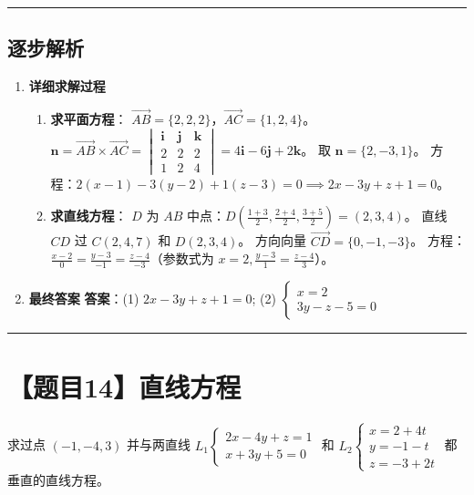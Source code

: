 \documentclass[UTF8]{ctexart}
\newenvironment{redenv}{\color{red}}{}
\newenvironment{detailedanalysis}{%
    \color{red}
    \begin{enumerate}[label=\textbf{第\arabic*步：}, leftmargin=*, align=left, itemsep=1.5ex]
}{%
    \end{enumerate}
}
\newcommand{\problemrule}{\noindent\rule{\textwidth}{1.5pt}\vspace{-0.8em}}
\newcommand{\analysisrule}{\noindent\rule{\textwidth}{0.8pt}\vspace{-0.8em}}
\begin{document}
\begin{redenv}
\analysisrule
\subsection*{逐步解析}

\begin{detailedanalysis}
\item \textbf{详细求解过程}
\begin{enumerate}[label=(\arabic*)]
\item \textbf{求平面方程}：
$\overrightarrow{AB} = \{2, 2, 2\}$，$\overrightarrow{AC} = \{1, 2, 4\}$。
$\mathbf{n} = \overrightarrow{AB} \times \overrightarrow{AC} = \begin{vmatrix} \mathbf{i} & \mathbf{j} & \mathbf{k} \\ 2 & 2 & 2 \\ 1 & 2 & 4 \end{vmatrix} = 4\mathbf{i} - 6\mathbf{j} + 2\mathbf{k}$。
取 $\mathbf{n} = \{2, -3, 1\}$。
方程：$2(x-1) - 3(y-2) + 1(z-3) = 0 \implies 2x - 3y + z + 1 = 0$。
\item \textbf{求直线方程}：
$D$ 为 $AB$ 中点：$D(\frac{1+3}{2}, \frac{2+4}{2}, \frac{3+5}{2}) = (2, 3, 4)$。
直线 $CD$ 过 $C(2, 4, 7)$ 和 $D(2, 3, 4)$。
方向向量 $\overrightarrow{CD} = \{0, -1, -3\}$。
方程：$\frac{x-2}{0} = \frac{y-3}{-1} = \frac{z-4}{-3}$（参数式为 $x=2, \frac{y-3}{1} = \frac{z-4}{3}$）。
\end{enumerate}

\item \textbf{最终答案}
\textbf{答案}：(1) $ 2x-3y+z+1=0 $; (2) $ \begin{cases} x=2 \\ 3y-z-5=0 \end{cases} $
\end{detailedanalysis}
\end{redenv}

\problemrule
\section*{【题目14】直线方程}
求过点 $ (-1,-4,3) $ 并与两直线 $ L_{1}\begin{cases}2x-4y+z=1\\ x+3y+5=0\end{cases} $ 和 $ L_{2}\begin{cases}x=2+4t\\ y=-1-t\\ z=-3+2t\end{cases} $ 都垂直的直线方程。
\end{document}

